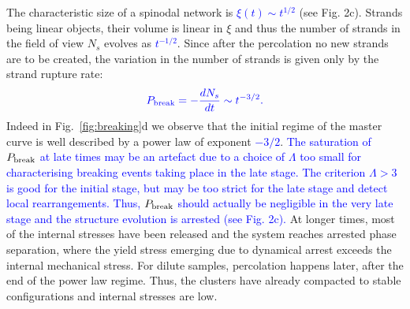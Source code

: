 \documentclass[footinbib,amsmath,amssymb,superscriptaddress,twocolumn]{revtex4}
\begin{document}
The characteristic size of a spinodal network is \textcolor{blue}{$\xi(t)\sim t^{1/2}$} (see Fig. 2c). Strands being linear objects, their volume is linear in $\xi$ and thus the number of strands in the field of view $N_s$ evolves as \textcolor{blue}{$t^{-1/2}$}. Since after the percolation no new strands are to be created, the variation in the number of strands is given only by the strand rupture rate:
\begin{equation}
\textcolor{blue}{P_\text{break} = -\frac{d N_s}{dt} \sim t^{-3/2}.}
\end{equation}
Indeed in Fig.~\ref{fig:breaking}d we observe that the initial regime of the master curve is well described by a power law of exponent \textcolor{blue}{$-3/2$}. 
\textcolor{blue}{The saturation of $P_{\rm break}$ at late times may be an artefact due to a choice of $\Lambda$ too small for characterising breaking events taking place in the late stage. 
The criterion $\Lambda>3$ is good for the initial stage, but may be too strict for the late stage and detect local rearrangements. 
Thus, $P_{\rm break}$ should actually be negligible in the very late stage and the structure evolution is arrested (see Fig. 2c).} 
At longer times, most of the internal stresses have been released and the system reaches arrested phase separation, where the yield stress emerging due to dynamical arrest 
exceeds the internal mechanical stress. 
For dilute samples, percolation happens later, after the end of the power law regime. Thus, the clusters have already compacted to stable configurations and internal stresses are low.
\end{document}
